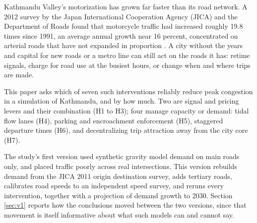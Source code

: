 Kathmandu Valley's motorization has grown far faster than its road network. A 2012 survey by the
Japan International Cooperation Agency (JICA) and the Department of Roads found that motorcycle
traffic had increased roughly 19.8 times since 1991, an average annual growth near 16 percent,
concentrated on arterial roads that have not expanded in proportion \citep{jica2012}. A city
without the years and capital for new roads or a metro line can still act on the roads it has:
retime signals, charge for road use at the busiest hours, or change when and where trips are made.

This paper asks which of seven such interventions reliably reduce peak congestion in a simulation
of Kathmandu, and by how much. Two are signal and pricing levers and their combination (H1 to H3);
four manage capacity or demand: tidal flow lanes (H4), parking and encroachment enforcement (H5),
staggered departure times (H6), and decentralizing trip attraction away from the city core (H7).

The study's first version used synthetic gravity model demand on main roads only, and placed
traffic poorly across real intersections. This version rebuilds demand from the JICA 2011 origin
destination survey, adds tertiary roads, calibrates road speeds to an independent speed survey,
and reruns every intervention, together with a projection of demand growth to 2030. Section
\ref{sec:v1} reports how the conclusions moved between the two versions, since that movement is
itself informative about what such models can and cannot say.
